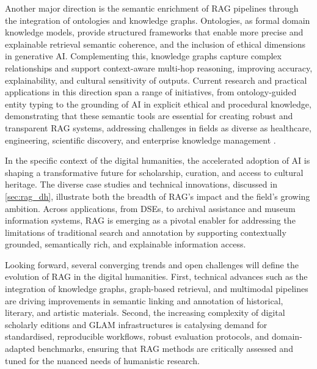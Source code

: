 \begin{spacing}{1.5}
Another major direction is the semantic enrichment of RAG pipelines through the integration of ontologies and knowledge graphs. Ontologies, as formal domain knowledge models, provide structured frameworks that enable more precise and explainable retrieval semantic coherence, and the inclusion of ethical dimensions in generative AI. Complementing this, knowledge graphs capture complex relationships and support context-aware multi-hop reasoning, improving accuracy, explainability, and cultural sensitivity of outputs. Current research and practical applications in this direction span a range of initiatives, from ontology-guided entity typing to the grounding of AI in explicit ethical and procedural knowledge, demonstrating that these semantic tools are essential for creating robust and transparent RAG systems, addressing challenges in fields as diverse as healthcare, engineering, scientific discovery, and enterprise knowledge management \citep{tiwari_ontorag_2025, ludwig_ontology-based_2025, bran_ontology-retrieval_2024, sharma_og-rag_2024, xiao_orag_2024, park_ontology-based_2024, debellis_integrating_2024,franco_ontology-based_2020}.

In the specific context of the digital humanities, the accelerated adoption of AI is shaping a transformative future for scholarship, curation, and access to cultural heritage. The diverse case studies and technical innovations, discussed in \autoref{sec:rag_dh}, illustrate both the breadth of RAG’s impact and the field’s growing ambition. Across applications, from DSEs, to archival assistance and museum information systems, RAG is emerging as a pivotal enabler for addressing the limitations of traditional search and annotation by supporting contextually grounded, semantically rich, and explainable information access.

Looking forward, several converging trends and open challenges will define the evolution of RAG in the digital humanities. First, technical advances such as the integration of knowledge graphs, graph-based retrieval, and multimodal pipelines are driving improvements in semantic linking and annotation of historical, literary, and artistic materials. Second, the increasing complexity of digital scholarly editions and GLAM infrastructures is catalysing demand for standardised, reproducible workflows, robust evaluation protocols, and domain-adapted benchmarks, ensuring that RAG methods are critically assessed and tuned for the nuanced needs of humanistic research.


\end{spacing}
